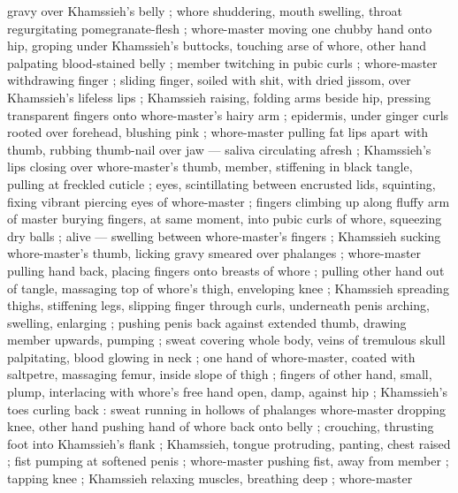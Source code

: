 gravy over Khamssieh's belly ; whore shuddering, mouth swelling, throat regurgitating pomegranate-flesh ; whore-master moving one chubby hand onto hip, groping under Khamssieh's buttocks, touching arse of whore, other hand palpating blood-stained belly ; member twitching in pubic curls ; whore-master withdrawing finger ; sliding finger, soiled with shit, with dried jissom, over Khamssieh's lifeless lips ; Khamssieh raising, folding arms beside hip, pressing transparent fingers onto whore-master's hairy arm ; epidermis, under ginger curls rooted over forehead, blushing pink ; whore-master pulling fat lips apart with thumb, rubbing thumb-nail over jaw --- saliva circulating afresh ; Khamssieh's lips closing over whore-master's thumb, member, stiffening in black tangle, pulling at freckled cuticle ; eyes, scintillating between encrusted lids, squinting, fixing vibrant piercing eyes of whore-master ; fingers climbing up along fluffy arm of master burying fingers, at same moment, into pubic curls of whore, squeezing dry balls ; alive --- swelling between whore-master's fingers ; Khamssieh sucking whore-master's thumb, licking gravy smeared over phalanges ; whore-master pulling hand back, placing fingers onto breasts of whore ; pulling other hand out of tangle, massaging top of whore's thigh, enveloping knee ; Khamssieh spreading thighs, stiffening legs, slipping finger through curls, underneath penis arching, swelling, enlarging ; pushing penis back against extended thumb, drawing member upwards, pumping ; sweat covering whole body, veins of tremulous skull palpitating, blood glowing in neck ; one hand of whore-master, coated with saltpetre, massaging femur, inside slope of thigh ; fingers of other hand, small, plump, interlacing with whore's free hand open, damp, against hip ; Khamssieh's toes curling back : sweat running in hollows of phalanges {\dubsemi} whore-master dropping knee, other hand pushing hand of whore back onto belly ; crouching, thrusting foot into Khamssieh's flank{\thd}  ; Khamssieh, tongue protruding, panting, chest raised ; fist pumping at softened penis{\td}  ; whore-master pushing fist, away from member ; tapping 
knee ; Khamssieh relaxing muscles, breathing deep  ; whore-master 
